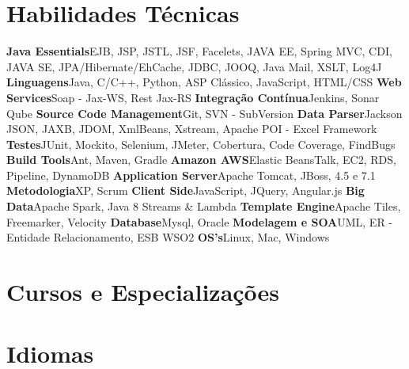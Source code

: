 \documentclass[11pt,a4paper]{moderncv}
\begin{document}
\section{Habilidades Técnicas}
\cvcomputer
{\textbf{Java Essentials}}{EJB, JSP, JSTL, JSF, Facelets, JAVA EE, Spring MVC, CDI, JAVA SE, JPA/Hibernate/EhCache, JDBC, JOOQ, Java Mail, XSLT, Log4J}
{\textbf{Linguagens}}{Java, C/C++, Python, ASP Clássico, JavaScript, HTML/CSS}
\cvcomputer
{\textbf{Web Services}}{Soap - Jax-WS, Rest Jax-RS}
{\textbf{Integração Contínua}}{Jenkins, Sonar Qube}
\cvcomputer
{\textbf{Source Code Management}}{Git, SVN - SubVersion}
{\textbf{Data Parser}}{Jackson JSON, JAXB, JDOM, XmlBeans, Xstream, Apache POI - Excel Framework}
\cvcomputer
{\textbf{Testes}}{JUnit, Mockito, Selenium, JMeter, Cobertura, Code Coverage, FindBugs}
{\textbf{Build Tools}}{Ant, Maven, Gradle}
\cvcomputer
{\textbf{Amazon AWS}}{Elastic BeansTalk, EC2, RDS, Pipeline, DynamoDB}
{\textbf{Application Server}}{Apache Tomcat, JBoss, 4.5 e 7.1}
\cvcomputer
{\textbf{Metodologia}}{XP, Scrum}
{\textbf{Client Side}}{JavaScript, JQuery, Angular.js}
\cvcomputer
{\textbf{Big Data}}{Apache Spark, Java 8 Streams \& Lambda}
{\textbf{Template Engine}}{Apache Tiles, Freemarker, Velocity}
\cvcomputer
{\textbf{Database}}{Mysql, Oracle}
{\textbf{Modelagem e SOA}}{UML, ER - Entidade Relacionamento, ESB WSO2}
\cvcomputer
{\textbf{OS's}}{Linux, Mac, Windows}
{}{}


\section{Cursos e Especializaç\~{o}es}


\section{Idiomas}
\end{document}
